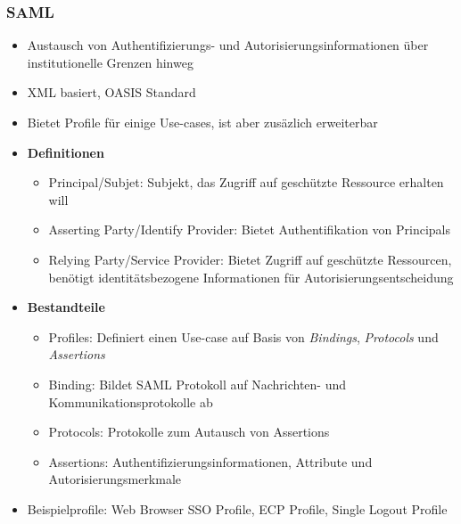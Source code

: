 \subsubsection{SAML}
\begin{itemize}
	\item Austausch von Authentifizierungs- und Autorisierungsinformationen über institutionelle Grenzen hinweg
	\item XML basiert, OASIS Standard
	\item Bietet Profile für einige Use-cases, ist aber zusäzlich erweiterbar
	\item \textbf{Definitionen}
	\begin{itemize}
		\item Principal/Subjet: Subjekt, das Zugriff auf geschützte Ressource erhalten will
		\item Asserting Party/Identify Provider: Bietet Authentifikation von Principals
		\item Relying Party/Service Provider: Bietet Zugriff auf geschützte Ressourcen, benötigt identitätsbezogene Informationen für Autorisierungsentscheidung
	\end{itemize}
	\item \textbf{Bestandteile}
	\begin{itemize}
		\item Profiles: Definiert einen Use-case auf Basis von \textit{Bindings}, \textit{Protocols} und \textit{Assertions}
		\item Binding: Bildet SAML Protokoll auf Nachrichten- und Kommunikationsprotokolle ab
		\item Protocols: Protokolle zum Autausch von Assertions
		\item Assertions: Authentifizierungsinformationen, Attribute und Autorisierungsmerkmale
	\end{itemize}
	\item Beispielprofile: Web Browser SSO Profile, ECP Profile, Single Logout Profile
\end{itemize}

